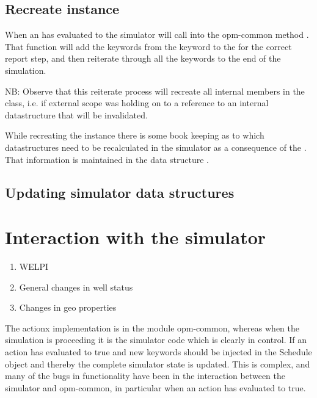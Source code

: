 \subsection{Recreate  instance}
When an \actionx{} has evaluated to  the simulator will call
into the opm-common method . That function
will add the keywords from the \actionx{} keyword to the
 for the correct report step, and then reiterate
through all the keywords to the end of the simulation.

NB: Observe that this reiterate process will recreate all internal members in
the  class, i.e. if external scope was holding on to a
reference to an internal  datastructure that will be
invalidated.

While recreating the  instance there is some book keeping
as to which datastructures need to be recalculated in the simulator as a
consequence of the \actionx{}. That information is maintained in the data
structure .


\subsection{Updating simulator data structures}



\section{Interaction with the simulator}

\begin{enumerate}
\item WELPI
\item General changes in well status
\item Changes in geo properties
\end{enumerate}

The actionx implementation is in the module opm-common, whereas when the
simulation is proceeding it is the simulator code which is clearly in control.
If an action has evaluated to true and new keywords should be injected in the
Schedule object and thereby the complete simulator state is updated. This is
complex, and many of the bugs in \actionx{} functionality have been in the
interaction between the simulator and opm-common, in particular when an action
has evaluated to true.

